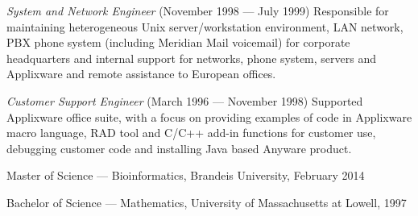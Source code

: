 \documentclass[11pt,article,oneside]{memoir}
\begin{document}
\ind \textit{System and Network Engineer} (November 1998 --- July 1999) Responsible for maintaining heterogeneous Unix server/workstation environment, LAN network, PBX phone system (including Meridian Mail voicemail) for corporate headquarters and internal support for networks, phone system, servers and Applixware and remote assistance to European offices.

\ind \textit{Customer Support Engineer} (March 1996 --- November 1998) Supported Applixware office suite, with a focus on providing examples of code in Applixware macro language, RAD tool and C/C++ add-in functions for customer use, debugging customer code and installing Java based Anyware product.

\bigskip



\ind Master of Science --- Bioinformatics, Brandeis University, February 2014

\ind Bachelor of Science --- Mathematics, University of Massachusetts at Lowell, 1997
\end{document}
